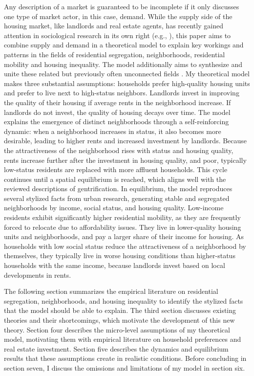 Any description of a market is guaranteed to be incomplete if it only discusses one type of market actor, in this case, demand. While the supply side of the housing market, like landlords and real estate agents, has recently gained attention in sociological research in its own right (e.g., \cite{korver-glennCompoundingInequalitiesHow2018, desmondPoorPayMore2019, rosenRacialDiscriminationHousing2021}), this paper aims to combine supply and demand in a theoretical model to explain key workings and patterns in the fields of residential segregation, neighborhoods, residential mobility and housing inequality. The model additionally aims to synthesize and unite these related but previously often unconnected fields \citep{hwangThingsChangeThings2016}. My theoretical model makes three substantial assumptions: households prefer high-quality housing units and prefer to live next to high-status neighbors. Landlords invest in improving the quality of their housing if average rents in the neighborhood increase. If landlords do not invest, the quality of housing decays over time. The model explains the emergence of distinct neighborhoods through a self-reinforcing dynamic: when a neighborhood increases in status, it also becomes more desirable, leading to higher rents and increased investment by landlords. Because the attractiveness of the neighborhood rises with status and housing quality, rents increase further after the investment in housing quality, and poor, typically low-status residents are replaced with more affluent households. This cycle continues until a spatial equilibrium is reached, which aligns well with the reviewed descriptions of gentrification. In equilibrium, the model reproduces several stylized facts from urban research, generating stable and segregated neighborhoods by income, social status, and housing quality. Low-income residents exhibit significantly higher residential mobility, as they are frequently forced to relocate due to affordability issues. They live in lower-quality housing units and neighborhoods, and pay a larger share of their income for housing. As households with low social status reduce the attractiveness of a neighborhood by themselves, they typically live in worse housing conditions than higher-status households with the same income, because landlords invest based on local developments in rents.

The following section summarizes the empirical literature on residential segregation, neighborhoods, and housing inequality to identify the stylized facts that the model should be able to explain. The third section discusses existing theories and their shortcomings, which motivate the development of this new theory. Section four describes the micro-level assumptions of my theoretical model, motivating them with empirical literature on household preferences and real estate investment. Section five describes the dynamics and equilibrium results that these assumptions create in realistic conditions. Before concluding in section seven, I discuss the omissions and limitations of my model in section six.